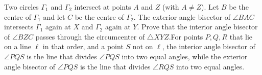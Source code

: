 Two circles $\Gamma_1$ and $\Gamma_2$ intersect at points $A$ and $Z$ (with $A\neq Z$). Let $B$ be the centre of $\Gamma_1$ and let $C$ be the centre of $\Gamma_2$. The exterior angle bisector of $\angle{BAC}$ intersects $\Gamma_1$ again at $X$ and $\Gamma_2$ again at $Y$. Prove that the interior angle bisector of $\angle{BZC}$ passes through the circumcenter of $\triangle{XYZ}$.For  points $P,Q,R$ that lie on a line $\ell$ in that order, and a point $S$ not on $\ell$,  the interior angle bisector of $\angle{PQS}$ is the line that divides $\angle{PQS}$ into two equal angles, while the exterior angle bisector of $\angle{PQS}$ is the line that divides $\angle{RQS}$ into two equal angles.